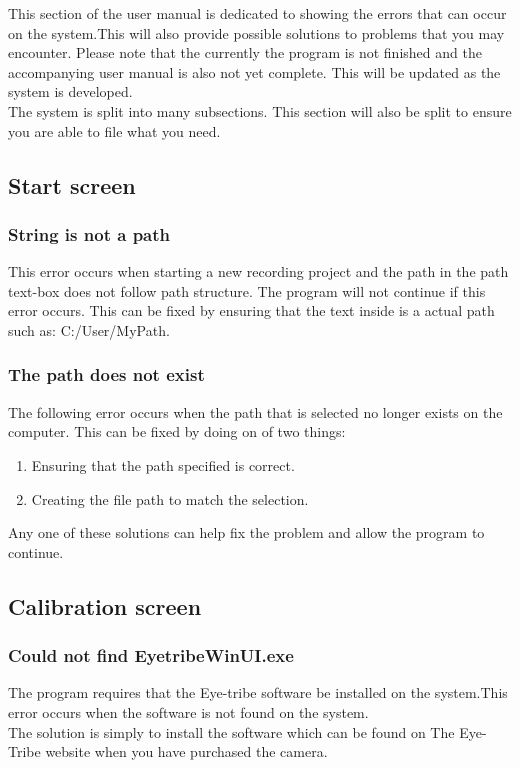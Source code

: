 This section of the user manual is dedicated to showing the errors that can occur on the system.This will also provide possible solutions to problems that you may encounter. Please note that the currently the program is not finished and the accompanying user manual is also not yet complete. This will be updated as the system is developed.\\

The system is split into many subsections. This section will also be split to ensure you are able to file what you need.

\subsection{Start screen}
\subsubsection{String is not a path}
This error occurs when starting a new recording project and the path in the path text-box does not follow path structure. The program will not continue if this error occurs.
This can be fixed by ensuring that the text inside is a actual path such as: C:/User/MyPath.
\subsubsection{The path does not exist}
The following error occurs when the path that is selected no longer exists on the computer. This can be fixed by doing on of two things:\\
\begin{enumerate}
\item Ensuring that the path specified is correct.
\item Creating the file path to match the selection. 
\end{enumerate}
Any one of these solutions can help fix the problem and allow the program to continue.
\subsection{Calibration screen}
\subsubsection{Could not find EyetribeWinUI.exe}
The program requires that the Eye-tribe software be installed on the system.This error occurs when the software is not found on the system.\\
The solution is simply to install the software which can be found on The Eye-Tribe website when you have purchased the camera.
